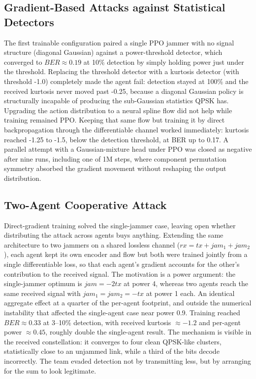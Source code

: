 \documentclass[conference]{IEEEtran}
\begin{document}
\subsection{Gradient-Based Attacks against Statistical Detectors}
The first trainable configuration paired a single PPO jammer with no signal structure (diagonal Gaussian) against a power-threshold detector, which converged to $BER\approx 0.19$ at 10\% detection by simply holding power just under the threshold. 
Replacing the threshold detector with a kurtosis detector (with threshold -1.0) completely made the agent fail: detection stayed at 100\% and the received kurtosis never moved past -0.25, because a diagonal Gaussian policy is structurally incapable of producing the sub-Gaussian statistics QPSK has.
Upgrading the action distribution to a neural spline flow did not help while training remained PPO.
Keeping that same flow but training it by direct backpropagation through the differentiable channel worked immediately: kurtosis reached -1.25 to -1.5, below the detection threshold, at BER up to 0.17.
A parallel attempt with a Gaussian-mixture head under PPO was closed as negative after nine runs, including one of 1M steps, where component permutation symmetry absorbed the gradient movement without reshaping the output distribution.

\subsection{Two-Agent Cooperative Attack}
Direct-gradient training solved the single-jammer case, leaving open whether distributing the attack across agents buys anything.
Extending the same architecture to two jammers on a shared lossless channel ($rx = tx + jam_1 + jam_2$), each agent kept its own encoder and flow but both were trained jointly from a single differentiable loss, so that each agent's gradient accounts for the other's contribution to the received signal. 
The motivation is a power argument: the single-jammer optimum is $jam = -2tx$ at power 4, whereas two agents reach the same received signal with $jam_1 = jam_2 = -tx$ at power 1 each. An identical aggregate effect at a quarter of the per-agent footprint, and outside the numerical instability that affected the single-agent case near power 0.9.
Training reached $BER\approx 0.33$ at 3–10\% detection, with received kurtosis $\approx -1.2$ and per-agent power $\approx 0.45$, roughly double the single-agent result.
The mechanism is visible in the received constellation: it converges to four clean QPSK-like clusters, statistically close to an unjammed link, while a third of the bits decode incorrectly.
The team evaded detection not by transmitting less, but by arranging for the sum to look legitimate.
\end{document}
